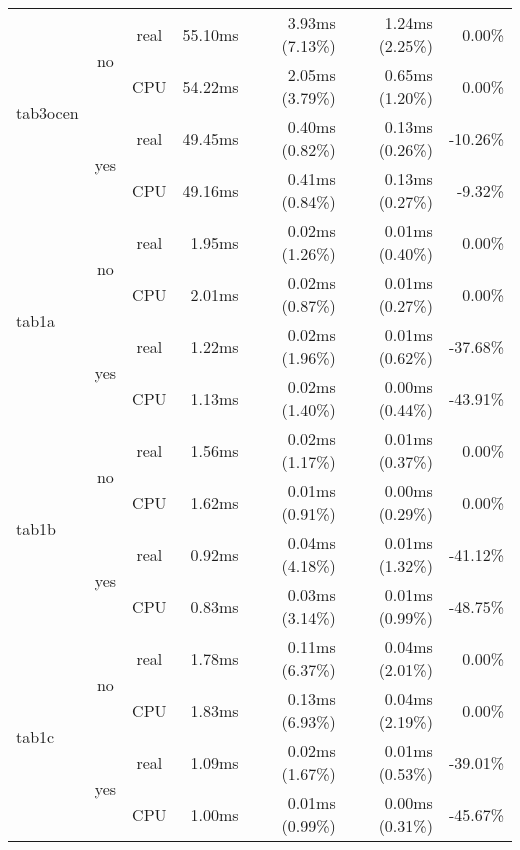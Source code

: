\documentclass[en]{pracamgr}
\begin{document}
\begin{small}
\begin{longtable}{|l|c|c|r|r|r|r|}
\hline
\multirow{4}{*}{tab3ocen} & \multirow{2}{*}{no}  & real & 55.10ms & 3.93ms (7.13\%) & 1.24ms (2.25\%) & 0.00\% \\*
                          &                      & CPU  & 54.22ms & 2.05ms (3.79\%) & 0.65ms (1.20\%) & 0.00\% \\*
                          \cline{2-7}
                          & \multirow{2}{*}{yes} & real & 49.45ms & 0.40ms (0.82\%) & 0.13ms (0.26\%) & -10.26\% \\*
                          &                      & CPU  & 49.16ms & 0.41ms (0.84\%) & 0.13ms (0.27\%) & -9.32\% \\
\hline
\multirow{4}{*}{tab1a}    & \multirow{2}{*}{no}  & real & 1.95ms & 0.02ms (1.26\%) & 0.01ms (0.40\%) & 0.00\% \\*
                          &                      & CPU  & 2.01ms & 0.02ms (0.87\%) & 0.01ms (0.27\%) & 0.00\% \\*
                          \cline{2-7}
                          & \multirow{2}{*}{yes} & real & 1.22ms & 0.02ms (1.96\%) & 0.01ms (0.62\%) & -37.68\% \\*
                          &                      & CPU  & 1.13ms & 0.02ms (1.40\%) & 0.00ms (0.44\%) & -43.91\% \\
\hline
\multirow{4}{*}{tab1b}    & \multirow{2}{*}{no}  & real & 1.56ms & 0.02ms (1.17\%) & 0.01ms (0.37\%) & 0.00\% \\*
                          &                      & CPU  & 1.62ms & 0.01ms (0.91\%) & 0.00ms (0.29\%) & 0.00\% \\*
                          \cline{2-7}
                          & \multirow{2}{*}{yes} & real & 0.92ms & 0.04ms (4.18\%) & 0.01ms (1.32\%) & -41.12\% \\*
                          &                      & CPU  & 0.83ms & 0.03ms (3.14\%) & 0.01ms (0.99\%) & -48.75\% \\
\hline
\multirow{4}{*}{tab1c}    & \multirow{2}{*}{no}  & real & 1.78ms & 0.11ms (6.37\%) & 0.04ms (2.01\%) & 0.00\% \\*
                          &                      & CPU  & 1.83ms & 0.13ms (6.93\%) & 0.04ms (2.19\%) & 0.00\% \\*
                          \cline{2-7}
                          & \multirow{2}{*}{yes} & real & 1.09ms & 0.02ms (1.67\%) & 0.01ms (0.53\%) & -39.01\% \\*
                          &                      & CPU  & 1.00ms & 0.01ms (0.99\%) & 0.00ms (0.31\%) & -45.67\% \\

\end{longtable}
\end{small}
\end{document}

